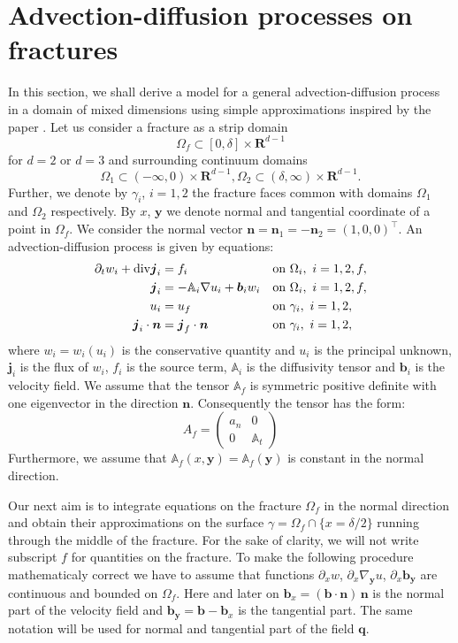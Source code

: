 \documentclass[12pt,a4paper]{report}
\def\prtl{\partial}
\def\vc#1{\mathbf{\boldsymbol{#1}}}     %
\def\tn#1{{\mathbb{#1}}}    %
\def\div{{\rm div}}
\def\grad{\nabla}
\def\Real{{\mathbf R}}
\begin{document}
\section{Advection-diffusion processes on fractures}
In this section, we shall derive a model for a general advection-diffusion process in a domain of mixed dimensions using
simple approximations inspired by the paper \citet{martin_modeling_2005}. Let us consider a fracture as a strip domain 
\[
 \Omega_f \subset [0,\delta] \times \Real^{d-1}
\]
for $d=2$ or $d=3$ and surrounding continuum domains
\[
 \Omega_1 \subset (-\infty,0)\times \Real^{d-1},
 \Omega_2 \subset (\delta,\infty)\times \Real^{d-1}.
\]
Further, we denote by $\gamma_i$, $i=1,2$ the fracture faces common with domains $\Omega_1$ and $\Omega_2$ respectively.
By $x$, $\vc y$ we denote normal and tangential coordinate of a point in $\Omega_f$. 
We consider the normal vector  $\vc n=\vc n_1=-\vc n_2=(1,0,0)^\top$.
An advection-diffusion process is given by equations:
\begin{align}
  \label{eq:fr:continuity}
  \prtl_t w_i + \div \vc j_i &= f_i&&  \text{on } \Omega_i,\ i=1,2,f,\\
  \label{eq:fr:flux}
  \vc j_i &= - \tn A_i\grad u_i + \vc b_i w_i&& \text{on } \Omega_i,\ i=1,2,f,\\
  \label{eq:fr:Dirichlet}
  u_i &= u_f&& \text{on } \gamma_i,\ i=1,2,\\
  \label{eq:fr:Neumann}
  \vc j_i \cdot \vc n &= \vc j_f \cdot \vc n&& \text{on } \gamma_i,\ i=1,2,
\end{align}
where $w_i=w_i(u_i)$ is the conservative quantity and $u_i$ is the principal unknown, $\vc j_i$ is the flux of $w_i$, $f_i$ is the source term,
$\tn A_i$ is the diffusivity tensor and $\vc b_i$ is the velocity field. We assume that the tensor $\tn A_f$ is symmetric positive definite 
with one eigenvector in the direction $\vc n$. Consequently the tensor has the form:
\[
 A_f = \begin{pmatrix} 
            a_n & 0  \\
            0 & \tn A_t
       \end{pmatrix}
\]
Furthermore, we assume that $\tn A_f(x, \vc y)=\tn A_f(\vc y)$ is constant in the normal direction.

Our next aim is to integrate equations on the fracture $\Omega_f$ in the normal direction 
and obtain their approximations on the surface $\gamma=\Omega_f \cap \{x=\delta/2\}$ running through the middle of the fracture. 
For the sake of clarity, we will not write subscript $f$ for quantities on the fracture. 
To make the following procedure mathematicaly correct we have to assume that functions
$\prtl_x w$, $\prtl_x \grad_{\vc y} u$, $\prtl_x \vc b_{\vc y}$ are continuous and bounded on $\Omega_f$. Here and later on 
$\vc b_x=(\vc b \cdot \vc n)\, \vc n$ is the normal part of the velocity field and $\vc b_{\vc y} = \vc b - \vc b_x$ is the tangential part.
The same notation will be used for normal and tangential part of the field $\vc q$.
\end{document}
